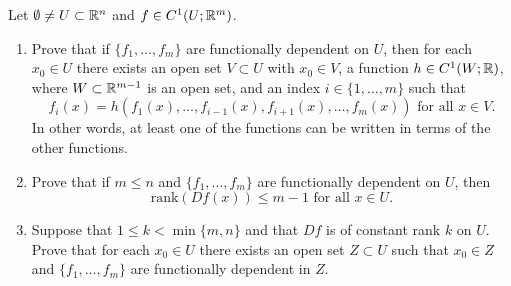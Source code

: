 \documentclass[a4paper]{article}
\begin{document}
\begin{thm}
Let $\emptyset \neq U \subset \mathbb{R}^n$ and $f \in 
C^1(U;\mathbb{R}^m)$.

\begin{enumerate}

\item Prove that if $\{f_1,\dots,f_m\}$ are functionally 
dependent on $U$, then for each $x_0 \in U$ there exists 
an open set $V \subset U$ with $x_0 \in V$,  a function  
$h \in C^1(W;\mathbb{R})$, where $W\subset \mathbb{R}^{m-1}$ is an open 
set, and an index $i \in\{1,\dots,m\}$ such that
\[
f_i(x) = h(f_1(x),\dots,f_{i-1}(x),f_{i+1}(x),
\dots,f_m(x)) \text{ for all }x \in V.
\]
In other words, at least one of the functions can be 
written in terms of the other functions.



\item Prove that if  $m \le n$ and $\{f_1,\dots,f_m\}$ 
are functionally dependent on $U$, then 
\[
\text{rank}(Df(x)) \le m-1 \text{ for all }x \in U.
\]



\item Suppose that $1 \le k < \min\{m,n\}$ and that $Df$ 
is of constant rank $k$ on $U$.  Prove that for each 
$x_0\in U$ there exists an open set $Z \subset U$ 
such that $x_0 \in Z$ and  $\{f_1,\dots,f_m\}$ are 
functionally dependent in $Z$.   
\end{enumerate}
  
\end{thm}
\end{document}
